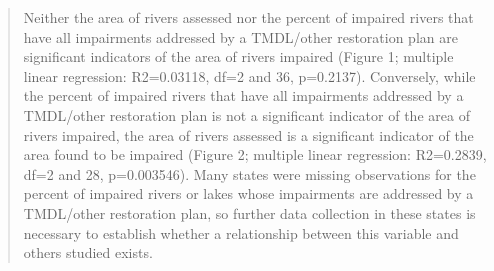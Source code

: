 \documentclass[]{article}
\begin{document}
\begin{quote}
Neither the area of rivers assessed nor the percent of impaired rivers
that have all impairments addressed by a TMDL/other restoration plan are
significant indicators of the area of rivers impaired (Figure 1;
multiple linear regression: R2=0.03118, df=2 and 36, p=0.2137).
Conversely, while the percent of impaired rivers that have all
impairments addressed by a TMDL/other restoration plan is not a
significant indicator of the area of rivers impaired, the area of rivers
assessed is a significant indicator of the area found to be impaired
(Figure 2; multiple linear regression: R2=0.2839, df=2 and 28,
p=0.003546). Many states were missing observations for the percent of
impaired rivers or lakes whose impairments are addressed by a TMDL/other
restoration plan, so further data collection in these states is
necessary to establish whether a relationship between this variable and
others studied exists.
\end{quote}
\end{document}
